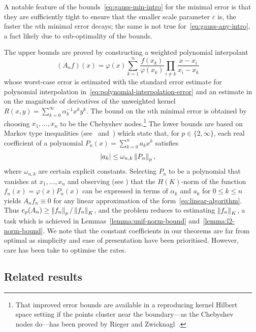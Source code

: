 \documentclass{mcom-l}
\numberwithin{equation}{section}
\numberwithin{theorem}{section} %
\begin{document}
A notable feature of the bounds~\eqref{eq:gauss-min-intro} for the minimal error is that they are sufficiently tight to ensure that the smaller scale parameter $\varepsilon$ is, the faster the $n$th minimal error decays; the same is not true for~\eqref{eq:gauss-any-intro}, a fact likely due to sub-optimality of the bounds.

The upper bounds are proved by constructing a weighted polynomial interpolant
\begin{equation*}
  (A_n f)(x) = \varphi(x) \sum_{k=1}^n \frac{f(x_k)}{\varphi(x_k)} \prod_{i \neq k} \frac{x - x_i}{x_i - x_k}
\end{equation*}
whose worst-case error is estimated with the standard error estimate for polynomial interpolation in~\eqref{eq:polynomial-interpolation-error} and an estimate in  on the magnitude of derivatives of the unweighted kernel $R(x, y) = \sum_{k=0}^\infty \alpha_k^{-1} x^k y^k$.
The bound on the $n$th minimal error is obtained by choosing $x_1, \ldots, x_n$ to be the Chebyshev nodes.\footnote{That improved error bounds are available in a reproducing kernel Hilbert space setting if the points cluster near the boundary---as the Chebyshev nodes do---has been proved by Rieger and Zwicknagl~\cite{RiegerZwicknagl2014}.}
The lower bounds are based on Markov type inequalities (see~\cite[Thm.\@~16.3.3]{RahmanSchmeisser2002} and~\cite{Labelle1969}) which state that, for $p \in \{2, \infty\}$, each real coefficient of a polynomial $P_n(x) = \sum_{k=0}^n a_k x^k$ satisfies
\begin{equation*}
  \abs[0]{a_k} \leq \omega_{n,k} \norm[0]{P_n}_p,
\end{equation*}
where $\omega_{n,k}$ are certain explicit constants.
Selecting $P_n$ to be a polynomial that vanishes at $x_1, \ldots, x_n$ and observing (see ) that the $H(K)$-norm of the function $f_n(x) = \varphi(x) P_n(x)$ can be expressed in terms of $\alpha_k$ and $a_k$ for $0 \leq k \leq n$ yields $A_n f_n \equiv 0$ for any linear approximation of the form~\eqref{eq:linear-algorithm}.
Thus $e_p(A_n) \geq \norm[0]{f_n}_p / \norm[0]{f_n}_K$, and the problem reduces to estimating $\norm[0]{f_n}_K$, a task which is achieved in Lemmas~\ref{lemma:unif-norm-bound} and~\ref{lemma:l2-norm-bound}.
We note that the constant coefficients in our theorems are far from optimal as simplicity and ease of presentation have been prioritised.
However, care has been take to optimise the rates.

\subsection{Related results}
\end{document}
